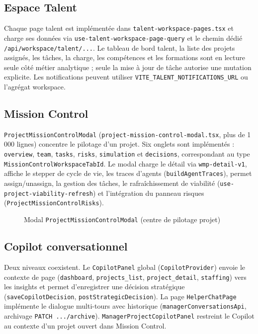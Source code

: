 \subsection{Espace Talent}

Chaque page talent est implémentée dans \texttt{talent-workspace-pages.tsx} et charge ses données via \texttt{use-talent-workspace-page-query} et le chemin dédié \texttt{/api/workspace/talent/...}. Le tableau de bord talent, la liste des projets assignés, les tâches, la charge, les compétences et les formations sont en lecture seule côté métier analytique ; seule la mise à jour de tâche autorise une mutation explicite. Les notifications peuvent utiliser \texttt{VITE\_TALENT\_NOTIFICATIONS\_URL} ou l'agrégat workspace.

\subsection{Mission Control}

\texttt{ProjectMissionControlModal} (\texttt{project-mission-control-modal.tsx}, plus de 1\,000 lignes) concentre le pilotage d'un projet. Six onglets sont implémentés : \texttt{overview}, \texttt{team}, \texttt{tasks}, \texttt{risks}, \texttt{simulation} et \texttt{decisions}, correspondant au type \texttt{MissionControlWorkspaceTabId}. Le modal charge le détail via \texttt{wmp-detail-v1}, affiche le stepper de cycle de vie, les traces d'agents (\texttt{buildAgentTraces}), permet assign/unassign, la gestion des tâches, le rafraîchissement de viabilité (\texttt{use-project-viability-refresh}) et l'intégration du panneau risques (\texttt{ProjectMissionControlRisks}).

\begin{figure}[htbp]
\centering
{}
\caption{Modal \texttt{ProjectMissionControlModal} (centre de pilotage projet)}
\label{fig:ui-mission-ch5}
\end{figure}

\subsection{Copilot conversationnel}

Deux niveaux coexistent. Le \texttt{CopilotPanel} global (\texttt{CopilotProvider}) envoie le contexte de page (\texttt{dashboard}, \texttt{projects\_list}, \texttt{project\_detail}, \texttt{staffing}) vers les insights et permet d'enregistrer une décision stratégique (\texttt{saveCopilotDecision}, \texttt{postStrategicDecision}). La page \texttt{HelperChatPage} implémente le dialogue multi-tours avec historique (\texttt{managerConversationsApi}, archivage \texttt{PATCH .../archive}). \texttt{ManagerProjectCopilotPanel} restreint le Copilot au contexte d'un projet ouvert dans Mission Control.

